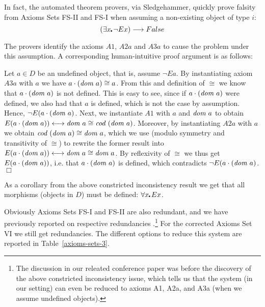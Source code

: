In fact, the automated theorem provers, via Sledgehammer, quickly
prove falsity from Axioms Sets FS-II and FS-I when assuming a 
 non-existing object of type $i$:
$$(\exists x\lambdot \neg E x) \imp False$$

The provers identify the axioms $A1$,
 $A2a$ and $A3a$ to cause the problem under this assumption. A
 corresponding  human-intuitive proof argument is as follows:
 
 Let $a\in D$ be an undefined object, that is, assume $¬E a$.  By
 instantiating axiom $A3a$ with $a$ we have $a \cdot (\textit{dom \/} a) \cong a$.  From
 this and definition of $\cong$ we know that $a \cdot (\textit{dom \/} a)$ is not
 defined. This is easy to see, since if $a \cdot (\textit{dom \/} a)$ were defined, we
 also had that $a$ is defined, which is not the case by assumption.
  Hence, $\neg E (a \cdot (\textit{dom \/} a)$.
Next, we instantiate $A1$ with $a$ and $\textit{dom \/} a$ to obtain
   $E(a \cdot (\textit{dom \/} a)) \longleftrightarrow \textit{dom \/} a \cong \textit{cod \/}(\textit{dom \/} a)$. Moreover,
   by instantiating $A2a$ with $a$ we obtain $\textit{cod \/}(\textit{dom \/} a) \cong \textit{dom \/} a$,
   which we use (modulo symmetry and transitivity of $\cong$) to
   rewrite the former result into 
   $E(a \cdot (\textit{dom \/} a)) \longleftrightarrow \textit{dom \/} a \cong \textit{dom \/} a$. By reflexivity of
   $\cong$ we thus get $E(a \cdot (\textit{dom \/} a))$, i.e. that $a \cdot
   (\textit{dom \/} a)$ is defined, which contradicts $\neg E (a \cdot (\textit{dom \/}
   a)$. $\Box$

As a corollary from the above constricted inconsistency result we get
that all morphisms (objects in $D$) must be
defined: $\forall x\lambdot E x$.









Obviously Axioms Sets FS-I and FS-II are also redundant, and we have previously reported 
on respective redundancies \cite{ICMS}.\footnote{The discussion in our releated
  conference paper \cite{ICMS} was before the discovery of the above 
constricted inconsistency issue, which tells us that the system (in our setting) can even be reduced 
to axioms A1, A2a, and A3a (when we assume undefined objects).} For
the corrected Axioms Set VI we still get redundancies. The different options to reduce this system are reported in
Table~\ref{axioms-sets-3}.

